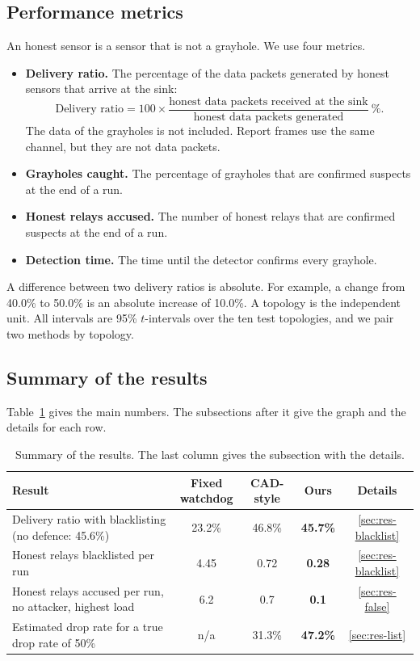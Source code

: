 \documentclass[11pt]{article}
\begin{document}
\subsection{Performance metrics}\label{sec:res-metrics}
\noindent
An honest sensor is a sensor that is not a grayhole.
We use four metrics.
\begin{itemize}\setlength{\itemsep}{0pt}
  \item \textbf{Delivery ratio.} The percentage of the data packets generated by honest sensors that arrive at the sink:
  \[
  \text{Delivery ratio} = 100 \times \frac{\text{honest data packets received at the sink}}{\text{honest data packets generated}}\ \%.
  \]
  The data of the grayholes is not included. Report frames use the same channel, but they are not data packets.
  \item \textbf{Grayholes caught.} The percentage of grayholes that are confirmed suspects at the end of a run.
  \item \textbf{Honest relays accused.} The number of honest relays that are confirmed suspects at the end of a run.
  \item \textbf{Detection time.} The time until the detector confirms every grayhole.
\end{itemize}
\noindent
A difference between two delivery ratios is absolute.
For example, a change from 40.0\% to 50.0\% is an absolute increase of 10.0\%.
A topology is the independent unit.
All intervals are 95\% $t$-intervals over the ten test topologies, and we pair two methods by topology.

\subsection{Summary of the results}\label{sec:res-summary}
\noindent
Table~\ref{tab:summary} gives the main numbers.
The subsections after it give the graph and the details for each row.

\begin{table}[htbp]
\centering\small
\caption{Summary of the results. The last column gives the subsection with the details.}\label{tab:summary}
\begin{tabular}{>{\raggedright\arraybackslash}p{6.4cm} c c c c}
\toprule
Result & \shortstack{Fixed\\watchdog} & CAD-style & \textbf{Ours} & Details \\
\midrule
Delivery ratio with blacklisting (no defence: 45.6\%) & 23.2\% & 46.8\% & \textbf{45.7\%} & \ref{sec:res-blacklist} \\
Honest relays blacklisted per run & 4.45 & 0.72 & \textbf{0.28} & \ref{sec:res-blacklist} \\
Honest relays accused per run, no attacker, highest load & 6.2 & 0.7 & \textbf{0.1} & \ref{sec:res-false} \\
Estimated drop rate for a true drop rate of 50\% & n/a & 31.3\% & \textbf{47.2\%} & \ref{sec:res-list} \\
\bottomrule
\end{tabular}
\end{table}
\end{document}
